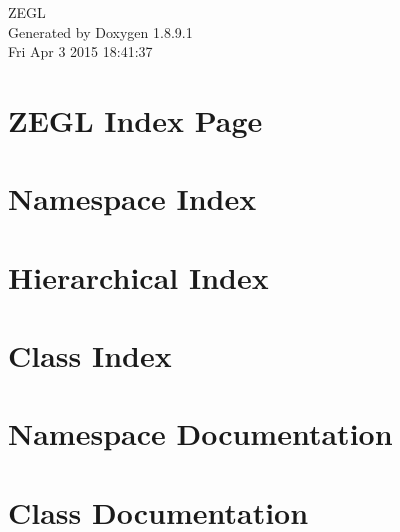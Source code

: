\documentclass[twoside]{book}
\newcommand{\+}{\discretionary{\mbox{\scriptsize$\hookleftarrow$}}{}{}}
\newcommand{\clearemptydoublepage}{%
  \newpage{\pagestyle{empty}\cleardoublepage}%
}
\begin{document}
\hypersetup{pageanchor=false,
             bookmarks=true,
             bookmarksnumbered=true,
             pdfencoding=unicode
            }
\begin{titlepage}
\vspace*{7cm}
\begin{center}%
{\Large Z\+E\+G\+L }\\
\vspace*{1cm}
{\large Generated by Doxygen 1.8.9.1}\\
\vspace*{0.5cm}
{\small Fri Apr 3 2015 18:41:37}\\
\end{center}
\end{titlepage}
\clearemptydoublepage
\tableofcontents
\clearemptydoublepage
{}
\hypersetup{pageanchor=true}

\chapter{Z\+E\+G\+L Index Page}
\label{index}\hypertarget{index}{}
\chapter{Namespace Index}

\chapter{Hierarchical Index}

\chapter{Class Index}

\chapter{Namespace Documentation}




\chapter{Class Documentation}























\backmatter
\newpage
{}
\clearemptydoublepage
{}
\printindex
\end{document}
